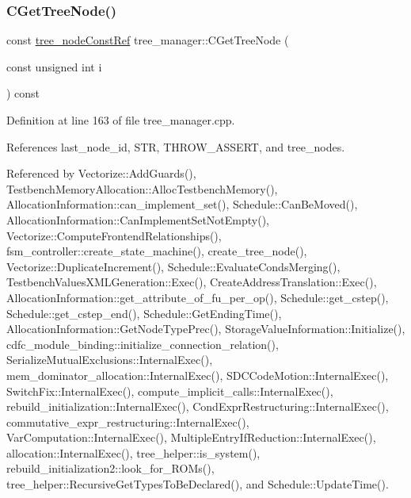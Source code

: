 \subsubsection{\texorpdfstring{C\+Get\+Tree\+Node()}{CGetTreeNode()}}
{\footnotesize\ttfamily const \hyperlink{tree__node_8hpp_a3cf5d02292c940f3892425a5b5fdec3c}{tree\+\_\+node\+Const\+Ref} tree\+\_\+manager\+::\+C\+Get\+Tree\+Node (\begin{DoxyParamCaption}\item[{const unsigned int}]{i }\end{DoxyParamCaption}) const}



Definition at line 163 of file tree\+\_\+manager.\+cpp.



References last\+\_\+node\+\_\+id, S\+TR, T\+H\+R\+O\+W\+\_\+\+A\+S\+S\+E\+RT, and tree\+\_\+nodes.



Referenced by Vectorize\+::\+Add\+Guards(), Testbench\+Memory\+Allocation\+::\+Alloc\+Testbench\+Memory(), Allocation\+Information\+::can\+\_\+implement\+\_\+set(), Schedule\+::\+Can\+Be\+Moved(), Allocation\+Information\+::\+Can\+Implement\+Set\+Not\+Empty(), Vectorize\+::\+Compute\+Frontend\+Relationships(), fsm\+\_\+controller\+::create\+\_\+state\+\_\+machine(), create\+\_\+tree\+\_\+node(), Vectorize\+::\+Duplicate\+Increment(), Schedule\+::\+Evaluate\+Conds\+Merging(), Testbench\+Values\+X\+M\+L\+Generation\+::\+Exec(), Create\+Address\+Translation\+::\+Exec(), Allocation\+Information\+::get\+\_\+attribute\+\_\+of\+\_\+fu\+\_\+per\+\_\+op(), Schedule\+::get\+\_\+cstep(), Schedule\+::get\+\_\+cstep\+\_\+end(), Schedule\+::\+Get\+Ending\+Time(), Allocation\+Information\+::\+Get\+Node\+Type\+Prec(), Storage\+Value\+Information\+::\+Initialize(), cdfc\+\_\+module\+\_\+binding\+::initialize\+\_\+connection\+\_\+relation(), Serialize\+Mutual\+Exclusions\+::\+Internal\+Exec(), mem\+\_\+dominator\+\_\+allocation\+::\+Internal\+Exec(), S\+D\+C\+Code\+Motion\+::\+Internal\+Exec(), Switch\+Fix\+::\+Internal\+Exec(), compute\+\_\+implicit\+\_\+calls\+::\+Internal\+Exec(), rebuild\+\_\+initialization\+::\+Internal\+Exec(), Cond\+Expr\+Restructuring\+::\+Internal\+Exec(), commutative\+\_\+expr\+\_\+restructuring\+::\+Internal\+Exec(), Var\+Computation\+::\+Internal\+Exec(), Multiple\+Entry\+If\+Reduction\+::\+Internal\+Exec(), allocation\+::\+Internal\+Exec(), tree\+\_\+helper\+::is\+\_\+system(), rebuild\+\_\+initialization2\+::look\+\_\+for\+\_\+\+R\+O\+Ms(), tree\+\_\+helper\+::\+Recursive\+Get\+Types\+To\+Be\+Declared(), and Schedule\+::\+Update\+Time().

